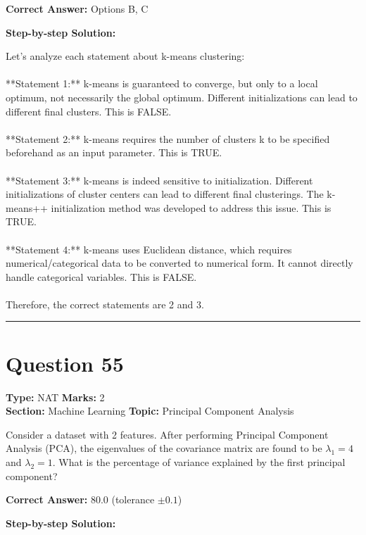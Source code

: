 \documentclass[11pt]{article}
\begin{document}
\textbf{Correct Answer:} Options B, C

\textbf{Step-by-step Solution:}

Let's analyze each statement about k-means clustering:\\
\\
**Statement 1:** k-means is guaranteed to converge, but only to a local optimum, not necessarily the global optimum. Different initializations can lead to different final clusters. This is FALSE.\\
\\
**Statement 2:** k-means requires the number of clusters k to be specified beforehand as an input parameter. This is TRUE.\\
\\
**Statement 3:** k-means is indeed sensitive to initialization. Different initializations of cluster centers can lead to different final clusterings. The k-means++ initialization method was developed to address this issue. This is TRUE.\\
\\
**Statement 4:** k-means uses Euclidean distance, which requires numerical/categorical data to be converted to numerical form. It cannot directly handle categorical variables. This is FALSE.\\
\\
Therefore, the correct statements are 2 and 3.

\vspace{0.8em}
\hrule
\vspace{0.4em}
\section*{Question 55}
\textbf{Type:} NAT \hfill \textbf{Marks:} 2\\
\textbf{Section:} Machine Learning \hfill \textbf{Topic:} Principal Component Analysis

Consider a dataset with 2 features. After performing Principal Component Analysis (PCA), the eigenvalues of the covariance matrix are found to be \(\lambda_1 = 4\) and \(\lambda_2 = 1\). What is the percentage of variance explained by the first principal component?



\textbf{Correct Answer:} 80.0 (tolerance \(\pm 0.1\))

\textbf{Step-by-step Solution:}
\end{document}
